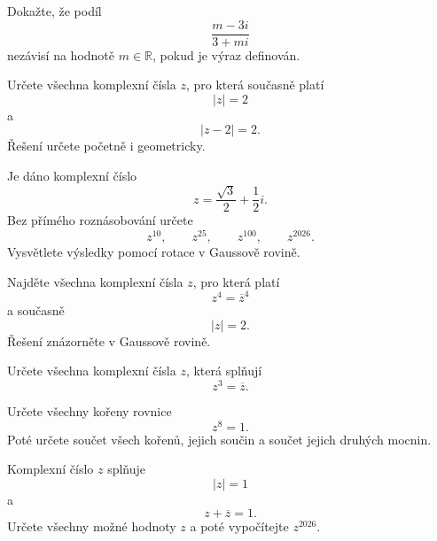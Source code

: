 \documentclass[12pt,a4paper]{article}
\begin{document}
\begin{exercise}
    Dokažte, že podíl
    \[
        \frac{m-3i}{3+mi}
    \]
    nezávisí na hodnotě $m\in\mathbb{R}$, pokud je výraz definován.
\end{exercise}


\begin{exercise}
    Určete všechna komplexní čísla $z$, pro která současně platí
    \[
        |z|=2
    \]
    a
    \[
        |z-2|=2.
    \]
    Řešení určete početně i geometricky.
\end{exercise}


\begin{exercise}
    Je dáno komplexní číslo
    \[
        z=\frac{\sqrt3}{2}+\frac12i.
    \]
    Bez přímého roznásobování určete
    \[
        z^{10},\qquad z^{25},\qquad z^{100},\qquad z^{2026}.
    \]
    Vysvětlete výsledky pomocí rotace v Gaussově rovině.
\end{exercise}


\begin{exercise}
    Najděte všechna komplexní čísla $z$, pro která platí
    \[
        z^4=\overline z^4
    \]
    a současně
    \[
        |z|=2.
    \]
    Řešení znázorněte v Gaussově rovině.
\end{exercise}


\begin{exercise}[$\star$ BONUS: Rovnice $z^3=\overline z$]
    Určete všechna komplexní čísla $z$, která splňují
    \[
        z^3=\overline z.
    \]
\end{exercise}


\begin{exercise}
    Určete všechny kořeny rovnice
    \[
        z^8=1.
    \]
    Poté určete součet všech kořenů, jejich součin a součet jejich druhých mocnin.
\end{exercise}


\begin{exercise}
    Komplexní číslo $z$ splňuje
    \[
        |z|=1
    \]
    a
    \[
        z+\overline z=1.
    \]
    Určete všechny možné hodnoty $z$ a poté vypočítejte $z^{2026}$.
\end{exercise}
\end{document}
